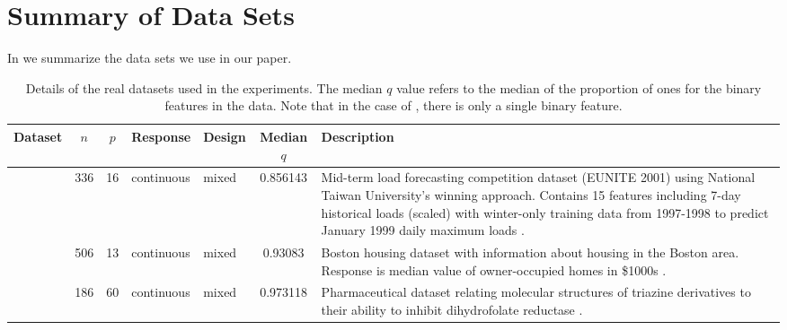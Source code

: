 \section{Summary of Data Sets}\label{sec:data-summary}

In  we summarize the data sets we use in our paper.

\begin{table}
  \centering
  \caption{Details of the real datasets used in the experiments. The median \(q\) value
    refers to the median of the proportion of ones for the binary features in the data. Note that in the case of , there is
    only a single binary feature.}
  \label{tab:dataset-info}
  \small
  \begin{tabular}{
      l
      S[table-format=4.0]
      S[table-format=4.0]
      l
      l
      S[table-format=1.3,round-mode=places,round-precision=3]
      p{6cm}
    }
    \toprule
    Dataset           & {\(n\)} & {\(p\)} & Response   & Design     & {Median \(q\)} & Description                                                                                                                                                                                                                                                                                 \\
    \midrule

     & 336     & 16      & continuous & mixed      & 0.856143       & Mid-term load forecasting competition dataset (EUNITE 2001) using National Taiwan University's winning approach. Contains 15 features including 7-day historical loads (scaled) with winter-only training data from 1997-1998 to predict January 1999 daily maximum loads \citep{chen2004}. \\

    \addlinespace
        & 506     & 13      & continuous & mixed      & 0.93083        & Boston housing dataset with information about housing in the Boston area. Response is median value of owner-occupied homes in \$1000s \citep{harrison1978}.                                                                                                                                 \\

    \addlinespace
      & 186     & 60      & continuous & mixed      & 0.973118       & Pharmaceutical dataset relating molecular structures of triazine derivatives to their ability to inhibit dihydrofolate reductase \citep{hirst1994,king1995}.                                                                                                                                \\


\end{tabular}
\end{table}
